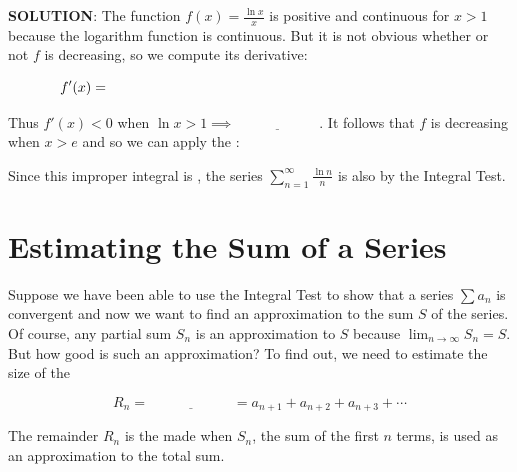 \documentclass[paper=a4, fontsize=11pt]{scrartcl} %
\numberwithin{equation}{section} %
\numberwithin{figure}{section} %
\numberwithin{table}{section} %
\newcommand{\ds}{\displaystyle}
\begin{document}
\textbf{SOLUTION}: The function $f(x)=\ds\frac{\ln x}{x}$ is positive and continuous for $x>1$ because the logarithm function is continuous. But it is not obvious whether or not $f$ is decreasing, so we compute its derivative:

\[f'(x) = \hspace{3.5in}\]

\indent

Thus $f'(x)<0$ when $\ln x>1 \implies \underline{\hspace{1in}}$. It follows that $f$ is decreasing when $x>e$ and so we can apply the \underline{\hspace{1in}} \underline{\hspace{1in}}:\\
\indent

\vspace{2in}

Since this improper integral is \underline{\hspace{1.25in}}, the series $\ds\sum_{n=1}^\infty \ds\frac{\ln n}{n}$ is also \underline{\hspace{1.25in}} by the Integral Test.


\section*{Estimating the Sum of a Series}
Suppose we have been able to use the Integral Test to show that a series $\ds\sum a_n$ is convergent and now we want to find an approximation to the sum $S$ of the series. Of course, any partial sum $S_n$ is an approximation to $S$ because $\ds\lim_{n\to\infty}S_n=S$. But how good is such an approximation? To find out, we need to estimate the size of the \underline{\hspace{1.25in}}

\[R_n = \underline{\hspace{1in}} = a_{n+1} + a_{n+2} + a_{n+3} + \cdots\]
\indent

The remainder $R_n$ is the \underline{\hspace{1in}} made when $S_n$, the sum of the first $n$ terms, is used as an approximation to the total sum.
\end{document}

